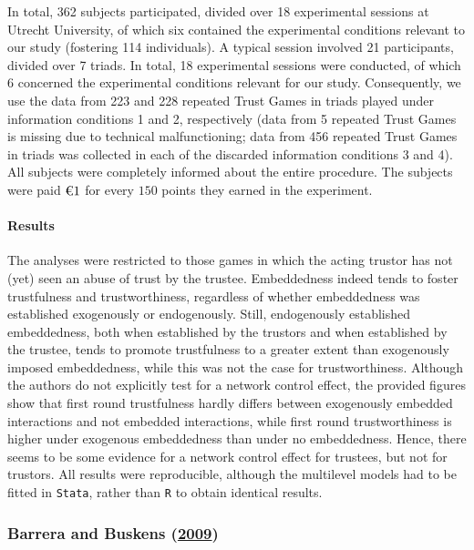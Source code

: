 \documentclass[
  11pt,
]{article}
\begin{document}
In total, 362 subjects participated, divided over 18 experimental sessions at Utrecht University, of which six contained the experimental conditions relevant to our study (fostering 114 individuals). A typical session involved 21 participants, divided over 7 triads. In total, 18 experimental sessions were conducted, of which 6 concerned the experimental conditions relevant for our study.
Consequently, we use the data from 223 and 228 repeated Trust Games in triads played under information conditions 1 and 2, respectively (data from 5 repeated Trust Games is missing due to technical malfunctioning; data from 456 repeated Trust Games in triads was collected in each of the discarded information conditions 3 and 4). All subjects were completely informed about the entire procedure. The subjects were paid \(\text{\texteuro}1\) for every \(150\) points they earned in the experiment.

\hypertarget{results-7}{%
\paragraph{Results}\label{results-7}}

The analyses were restricted to those games in which the acting trustor has not (yet) seen an abuse of trust by the trustee. Embeddedness indeed tends to foster trustfulness and trustworthiness, regardless of whether embeddedness was established exogenously or endogenously. Still, endogenously established embeddedness, both when established by the trustors and when established by the trustee, tends to promote trustfulness to a greater extent than exogenously imposed embeddedness, while this was not the case for trustworthiness. Although the authors do not explicitly test for a network control effect, the provided figures show that first round trustfulness hardly differs between exogenously embedded interactions and not embedded interactions, while first round trustworthiness is higher under exogenous embeddedness than under no embeddedness. Hence, there seems to be some evidence for a network control effect for trustees, but not for trustors.
All results were reproducible, although the multilevel models had to be fitted in \texttt{Stata}, rather than \texttt{R} to obtain identical results.

\hypertarget{barrera_buskens_third_2009}{%
\subsubsection{\texorpdfstring{Barrera and Buskens (\protect\hyperlink{ref-barrera_buskens_third_2009}{2009})}{Barrera and Buskens (2009)}}\label{barrera_buskens_third_2009}}
\end{document}
